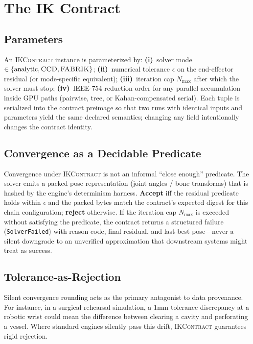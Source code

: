 \documentclass[sigconf,nonacm]{acmart}
\newcommand{\ikcontract}{\textsc{IKContract}}
\newcommand{\fabrik}{\textsc{FABRIK}}
\newcommand{\ccd}{\textsc{CCD}}
\begin{document}
\section{The IK Contract}
\label{sec:contract}

\subsection{Parameters}
\label{sec:ik:params}
An \ikcontract{} instance is parameterized by: \textbf{(i)}~solver mode
$\in \{\text{analytic}, \ccd{}, \fabrik{}\}$; \textbf{(ii)}~numerical
tolerance $\epsilon$ on the end-effector residual (or mode-specific
equivalent); \textbf{(iii)}~iteration cap $N_{\max}$ after which the
solver must stop; \textbf{(iv)}~IEEE-754 reduction order for any parallel
accumulation inside GPU paths (pairwise, tree, or Kahan-compensated
serial). Each tuple is serialized into the contract preimage so that two
runs with identical inputs and parameters yield the same declared semantics; changing any field intentionally changes the contract identity.

\subsection{Convergence as a Decidable Predicate}
\label{sec:ik:convergence}
Convergence under \ikcontract{} is not an informal ``close enough''
predicate. The solver emits a packed pose representation (joint angles /
bone transforms) that is hashed by the engine's determinism harness.
\textbf{Accept} iff the residual predicate holds within $\epsilon$ and the
packed bytes match the contract's expected digest for this chain configuration; \textbf{reject} otherwise. If the iteration cap
$N_{\max}$ is exceeded without satisfying the predicate, the contract
returns a structured failure (\texttt{SolverFailed}) with reason code,
final residual, and last-best pose---never a silent downgrade to an
unverified approximation that downstream systems might treat as success.

\subsection{Tolerance-as-Rejection}
Silent convergence rounding acts as the primary antagonist to data provenance. For instance, in a surgical-rehearsal simulation, a $1$mm tolerance discrepancy at a robotic wrist could mean the difference between clearing a cavity and perforating a vessel. Where standard engines silently pass this drift, \ikcontract{} guarantees rigid rejection.
\end{document}
